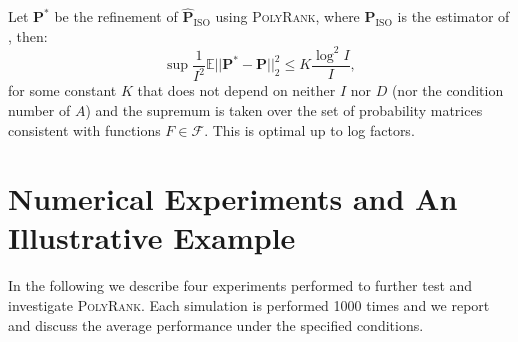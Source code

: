 \documentclass[twoside,11pt]{article}
\begin{document}
\begin{theorem} 
\label{the:RSS_ISO_SP}
Let $\boldsymbol{P}^*$  be the refinement of  $\boldsymbol{\hat{P}}_{\text{ISO}}$ using \textsc{PolyRank}, where $\boldsymbol{\hat{P}}_{\text{ISO}}$ is the estimator of \citet{chatterjee}, then:
\begin{equation}
	\sup \frac{1}{I^2} \mathbb{E} ||\boldsymbol{P}^* - \boldsymbol{P} ||_2^2 \leq K  \frac{\log^2 I}{I},
\end{equation}
for some constant $K $ that does not depend on neither $I$ nor $D$ (nor the condition number of $A$) and the supremum is taken over the set of probability matrices consistent with functions $F \in \mathcal{F}$. This is optimal up to log factors. 
\end{theorem}


\section{Numerical Experiments and An Illustrative Example}
\label{sec:numerical_experiments}


In the following we describe four experiments performed to further test and  investigate \textsc{PolyRank}. Each simulation is performed 1000 times and we report  and discuss  the average performance under the specified conditions.
\end{document}

